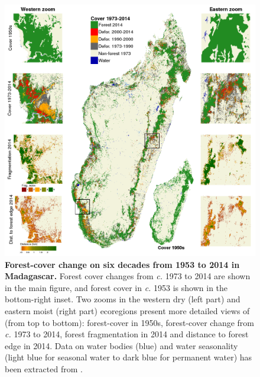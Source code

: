 \documentclass[a4paper, 12pt, leqno]{article} %
\begin{document}
\newpage

\begin{figure}[h!]
  \centering
  
  \includegraphics[width=\textwidth]{outputs/fig_fcc_highres.png}
  
  \caption{\textbf{Forest-cover change on six decades from 1953
      to 2014 in Madagascar.} Forest cover changes from \emph{c.} 1973 to 2014
    are shown in the main figure, and forest cover in \emph{c.} 1953 is
    shown in the bottom-right inset. Two zooms in the western dry (left
    part) and eastern moist (right part) ecoregions present more detailed
    views of (from top to bottom): forest-cover in 1950s, forest-cover
    change from \emph{c.} 1973 to 2014, forest fragmentation in 2014 and
    distance to forest edge in 2014. Data on water bodies (blue) and water
    seasonality (light blue for seasonal water to dark blue for permanent
    water) has been extracted from \citet{Pekel2016}.}

  \label{fig:fcc}

\end{figure}

\newpage
\end{document}

